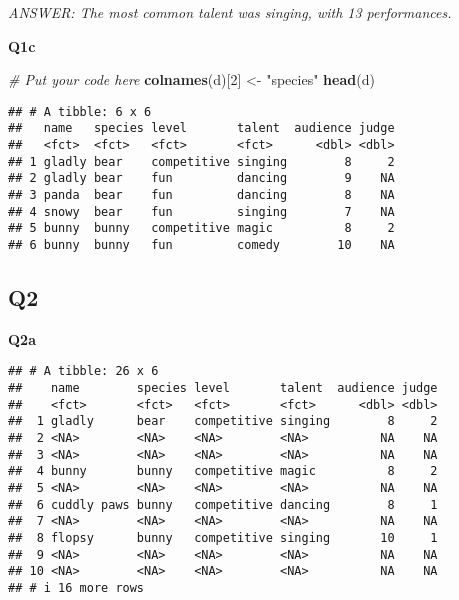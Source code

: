 \documentclass[
]{article}
\newenvironment{Shaded}{\begin{snugshade}}{\end{snugshade}}
\newcommand{\CommentTok}[1]{\textcolor[rgb]{0.56,0.35,0.01}{\textit{#1}}}
\newcommand{\DecValTok}[1]{\textcolor[rgb]{0.00,0.00,0.81}{#1}}
\newcommand{\FunctionTok}[1]{\textcolor[rgb]{0.13,0.29,0.53}{\textbf{#1}}}
\newcommand{\NormalTok}[1]{#1}
\newcommand{\OtherTok}[1]{\textcolor[rgb]{0.56,0.35,0.01}{#1}}
\newcommand{\SpecialCharTok}[1]{\textcolor[rgb]{0.81,0.36,0.00}{\textbf{#1}}}
\newcommand{\StringTok}[1]{\textcolor[rgb]{0.31,0.60,0.02}{#1}}
\begin{document}
\emph{ANSWER: The most common talent was singing, with 13 performances.}

\textbf{Q1c}

\begin{Shaded}
\begin{Highlighting}[]
\CommentTok{\# Put your code here}
\FunctionTok{colnames}\NormalTok{(d)[}\DecValTok{2}\NormalTok{] }\OtherTok{\textless{}{-}} \StringTok{"species"}
\FunctionTok{head}\NormalTok{(d)}
\end{Highlighting}
\end{Shaded}

\begin{verbatim}
## # A tibble: 6 x 6
##   name   species level       talent  audience judge
##   <fct>  <fct>   <fct>       <fct>      <dbl> <dbl>
## 1 gladly bear    competitive singing        8     2
## 2 gladly bear    fun         dancing        9    NA
## 3 panda  bear    fun         dancing        8    NA
## 4 snowy  bear    fun         singing        7    NA
## 5 bunny  bunny   competitive magic          8     2
## 6 bunny  bunny   fun         comedy        10    NA
\end{verbatim}

\hypertarget{q2}{%
\subsection{Q2}\label{q2}}

\textbf{Q2a}

\begin{Shaded}
\end{Shaded}

\begin{verbatim}
## # A tibble: 26 x 6
##    name        species level       talent  audience judge
##    <fct>       <fct>   <fct>       <fct>      <dbl> <dbl>
##  1 gladly      bear    competitive singing        8     2
##  2 <NA>        <NA>    <NA>        <NA>          NA    NA
##  3 <NA>        <NA>    <NA>        <NA>          NA    NA
##  4 bunny       bunny   competitive magic          8     2
##  5 <NA>        <NA>    <NA>        <NA>          NA    NA
##  6 cuddly paws bunny   competitive dancing        8     1
##  7 <NA>        <NA>    <NA>        <NA>          NA    NA
##  8 flopsy      bunny   competitive singing       10     1
##  9 <NA>        <NA>    <NA>        <NA>          NA    NA
## 10 <NA>        <NA>    <NA>        <NA>          NA    NA
## # i 16 more rows
\end{verbatim}
\end{document}
